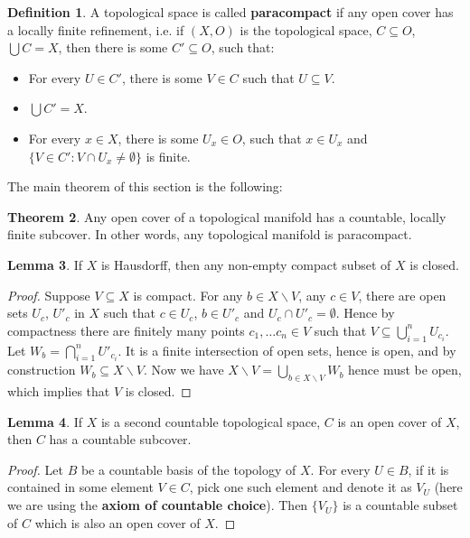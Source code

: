 \documentclass{article}
\theoremstyle{definition}
\newtheorem{thm}{Theorem}[section]
\newtheorem{lem}[thm]{Lemma}
\newtheorem{dfn}[thm]{Definition}
\begin{document}
\begin{dfn}
    A topological space is called {\bf paracompact} if any open cover has a locally finite refinement, i.e. if $(X, O)$ is the topological space, $C\subseteq O$, $\bigcup C=X$, then there is some $C'\subseteq O$, such that:
    \begin{itemize}
        \item For every $U\in C'$, there is some $V\in C$ such that $U\subseteq V$.
        \item $\bigcup C'=X$.
        \item For every $x\in X$, there is some $U_x\in O$, such that $x\in U_x$ and $\{V\in C': V\cap U_x\not=\emptyset\}$ is finite.
    \end{itemize}
\end{dfn}

The main theorem of this section is the following:

\begin{thm}\label{para}
    Any open cover of a topological manifold has a countable, locally finite subcover. In other words, any topological manifold is paracompact.
\end{thm}

\begin{lem}\label{lem1para}
    If $X$ is Hausdorff, then any non-empty compact subset of $X$ is closed.
\end{lem}

\begin{proof}
    Suppose $V\subseteq X$ is compact. For any $b\in X\backslash V$, any $c\in V$, there are open sets $U_c$, $U'_c$ in $X$ such that $c\in U_c$, $b\in U'_c$ and $U_c\cap U'_c=\emptyset$. Hence by compactness there are finitely many points $c_1, \dots c_n\in V$ such that $V\subseteq \bigcup_{i=1}^n U_{c_i}$. Let $W_b=\bigcap_{i=1}^n U'_{c_i}$. It is a finite intersection of open sets, hence is open, and by construction $W_b\subseteq X\backslash V$. Now we have $X\backslash V=\bigcup_{b\in X\backslash V}W_b$ hence must be open, which implies that $V$ is closed.
\end{proof}

\begin{lem}\label{lem12para}
    If $X$ is a second countable topological space, $C$ is an open cover of $X$, then $C$ has a countable subcover.
\end{lem}

\begin{proof}
    Let $B$ be a countable basis of the topology of $X$. For every $U\in B$, if it is contained in some element $V\in C$, pick one such element and denote it as $V_U$ (here we are using the {\bf axiom of countable choice}). Then $\{V_U\}$ is a countable subset of $C$ which is also an open cover of $X$.
\end{proof}
\end{document}

